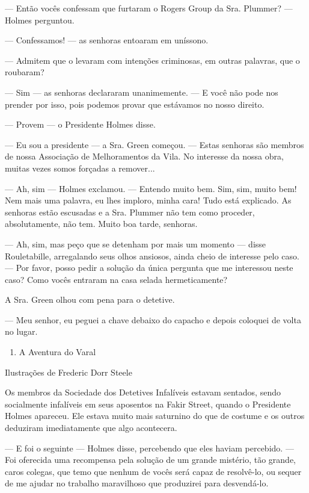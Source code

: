 --- Então vocês confessam que furtaram o Rogers Group da Sra. Plummer?
--- Holmes perguntou.

--- Confessamos! --- as senhoras entoaram em uníssono.

--- Admitem que o levaram com intenções criminosas, em outras palavras,
que o roubaram?

--- Sim --- as senhoras declararam unanimemente. --- E você não pode nos
prender por isso, pois podemos provar que estávamos no nosso direito.

--- Provem --- o Presidente Holmes disse.

--- Eu sou a presidente --- a Sra. Green começou. --- Estas senhoras são
membros de nossa Associação de Melhoramentos da Vila. No interesse da
nossa obra, muitas vezes somos forçadas a remover...

--- Ah, sim --- Holmes exclamou. --- Entendo muito bem. Sim, sim, muito
bem! Nem mais uma palavra, eu lhes imploro, minha cara! Tudo está
explicado. As senhoras estão escusadas e a Sra. Plummer não tem como
proceder, absolutamente, não tem. Muito boa tarde, senhoras.

--- Ah, sim, mas peço que se detenham por mais um momento --- disse
Rouletabille, arregalando seus olhos ansiosos, ainda cheio de interesse
pelo caso. --- Por favor, posso pedir a solução da única pergunta que me
interessou neste caso? Como vocês entraram na casa selada
hermeticamente?

A Sra. Green olhou com pena para o detetive.

--- Meu senhor, eu peguei a chave debaixo do capacho e depois coloquei
de volta no lugar.

\begin{enumerate}
\item
  A Aventura do Varal
\end{enumerate}

Ilustrações de Frederic Dorr Steele

Os membros da Sociedade dos Detetives Infalíveis estavam sentados, sendo
socialmente infalíveis em seus aposentos na Fakir Street, quando o
Presidente Holmes apareceu. Ele estava muito mais saturnino do que de
costume e os outros deduziram imediatamente que algo acontecera.

--- E foi o seguinte --- Holmes disse, percebendo que eles haviam
percebido. --- Foi oferecida uma recompensa pela solução de um grande
mistério, tão grande, caros colegas, que temo que nenhum de vocês será
capaz de resolvê-lo, ou sequer de me ajudar no trabalho maravilhoso que
produzirei para desvendá-lo.


